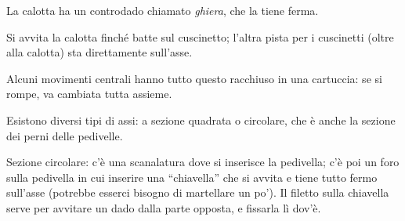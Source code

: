 La calotta ha un controdado chiamato \emph{ghiera}, che la tiene ferma.

Si avvita la calotta finché batte sul cuscinetto; l'altra pista per i cuscinetti (oltre alla calotta) sta direttamente sull'asse.

Alcuni movimenti centrali hanno tutto questo racchiuso in una cartuccia: se si rompe, va cambiata tutta assieme.

Esistono diversi tipi di assi: a sezione quadrata o circolare, che è anche la sezione dei perni delle pedivelle.

Sezione circolare: c'è una scanalatura dove si inserisce la pedivella; c'è poi un foro sulla pedivella in cui inserire una ``chiavella'' che si avvita e tiene tutto fermo sull'asse (potrebbe esserci bisogno di martellare un po').
Il filetto sulla chiavella serve per avvitare un dado dalla parte opposta, e fissarla lì dov'è.
